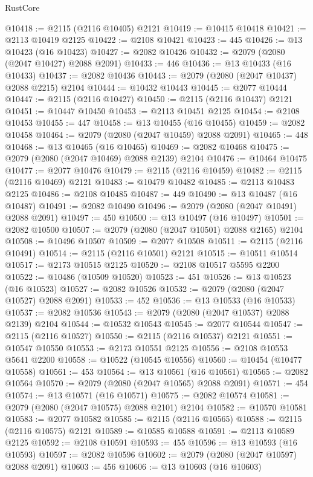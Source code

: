 \begin{lexlean}{RustCore}
\begin{coremodule}
@10418 := @2115 (@2116 @10405) @2121
@10419 := @10415 @10418
@10421 := @2113 @10419 @2125
@10422 := @2108 @10421
@10423 := 445
@10426 := @13 @10423 (@16 @10423)
@10427 := @2082 @10426
@10432 := @2079 (@2080 (@2047 @10427) @2088 @2091)
@10433 := 446
@10436 := @13 @10433 (@16 @10433)
@10437 := @2082 @10436
@10443 := @2079 (@2080 (@2047 @10437) @2088 @2215) @2104
@10444 := @10432 @10443
@10445 := @2077 @10444
@10447 := @2115 (@2116 @10427)
@10450 := @2115 (@2116 @10437) @2121
@10451 := @10447 @10450
@10453 := @2113 @10451 @2125
@10454 := @2108 @10453
@10455 := 447
@10458 := @13 @10455 (@16 @10455)
@10459 := @2082 @10458
@10464 := @2079 (@2080 (@2047 @10459) @2088 @2091)
@10465 := 448
@10468 := @13 @10465 (@16 @10465)
@10469 := @2082 @10468
@10475 := @2079 (@2080 (@2047 @10469) @2088 @2139) @2104
@10476 := @10464 @10475
@10477 := @2077 @10476
@10479 := @2115 (@2116 @10459)
@10482 := @2115 (@2116 @10469) @2121
@10483 := @10479 @10482
@10485 := @2113 @10483 @2125
@10486 := @2108 @10485
@10487 := 449
@10490 := @13 @10487 (@16 @10487)
@10491 := @2082 @10490
@10496 := @2079 (@2080 (@2047 @10491) @2088 @2091)
@10497 := 450
@10500 := @13 @10497 (@16 @10497)
@10501 := @2082 @10500
@10507 := @2079 (@2080 (@2047 @10501) @2088 @2165) @2104
@10508 := @10496 @10507
@10509 := @2077 @10508
@10511 := @2115 (@2116 @10491)
@10514 := @2115 (@2116 @10501) @2121
@10515 := @10511 @10514
@10517 := @2173 @10515 @2125
@10520 := @2108 @10517 @5595 @2200
@10522 := @10486 (@10509 @10520)
@10523 := 451
@10526 := @13 @10523 (@16 @10523)
@10527 := @2082 @10526
@10532 := @2079 (@2080 (@2047 @10527) @2088 @2091)
@10533 := 452
@10536 := @13 @10533 (@16 @10533)
@10537 := @2082 @10536
@10543 := @2079 (@2080 (@2047 @10537) @2088 @2139) @2104
@10544 := @10532 @10543
@10545 := @2077 @10544
@10547 := @2115 (@2116 @10527)
@10550 := @2115 (@2116 @10537) @2121
@10551 := @10547 @10550
@10553 := @2173 @10551 @2125
@10556 := @2108 @10553 @5641 @2200
@10558 := @10522 (@10545 @10556)
@10560 := @10454 (@10477 @10558)
@10561 := 453
@10564 := @13 @10561 (@16 @10561)
@10565 := @2082 @10564
@10570 := @2079 (@2080 (@2047 @10565) @2088 @2091)
@10571 := 454
@10574 := @13 @10571 (@16 @10571)
@10575 := @2082 @10574
@10581 := @2079 (@2080 (@2047 @10575) @2088 @2101) @2104
@10582 := @10570 @10581
@10583 := @2077 @10582
@10585 := @2115 (@2116 @10565)
@10588 := @2115 (@2116 @10575) @2121
@10589 := @10585 @10588
@10591 := @2113 @10589 @2125
@10592 := @2108 @10591
@10593 := 455
@10596 := @13 @10593 (@16 @10593)
@10597 := @2082 @10596
@10602 := @2079 (@2080 (@2047 @10597) @2088 @2091)
@10603 := 456
@10606 := @13 @10603 (@16 @10603)

\end{coremodule}
\end{lexlean}
